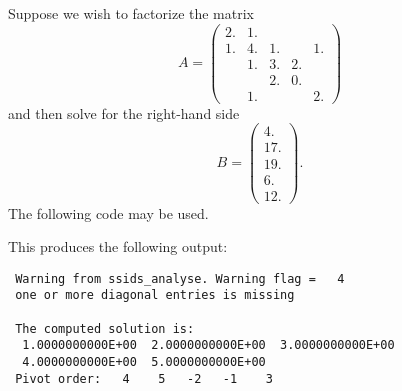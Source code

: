 \documentclass{spral}
\begin{document}
Suppose we wish to factorize the matrix
\[ A = \left(
\begin{array}{ccccc}
2. & 1. \\
1. & 4. & 1. & & 1. \\
 & 1. & 3. & 2. \\
& & 2. & 0. &  \\
& 1. & & & 2.
\end{array}
\right)
\]
and then solve for the right-hand side
\[ B = \left(
\begin{array}{c}
4. \\
17. \\
19. \\
6. \\
12.
\end{array}
\right).
\]
The following code may be used.

This produces the following output:
\begin{verbatim}
 Warning from ssids_analyse. Warning flag =   4
 one or more diagonal entries is missing

 The computed solution is:
  1.0000000000E+00  2.0000000000E+00  3.0000000000E+00
  4.0000000000E+00  5.0000000000E+00
 Pivot order:   4    5   -2   -1    3

\end{verbatim}

\begin{funders}
\end{funders}
\end{document}

